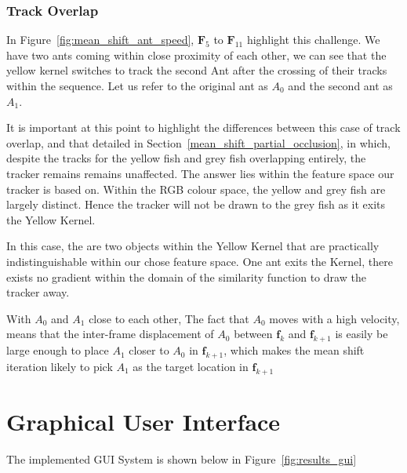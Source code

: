 \subsubsection{Track Overlap}\label{mean_shift_track_overlap}
In Figure~\ref{fig:mean_shift_ant_speed}, $\mathbf{F}_5$ to $\mathbf{F}_{11}$
highlight this challenge. We have two ants coming within close proximity of
each other, we can see that the yellow kernel switches to track the second Ant
after the crossing of their tracks within the sequence. Let us refer to the
original ant as $A_0$ and the second ant as $A_1$. 

It is important at this point to highlight the differences between this case of
track overlap, and that detailed in Section~\ref{mean_shift_partial_occlusion},
in which, despite the tracks for the yellow fish and grey fish overlapping
entirely, the tracker remains remains unaffected.
The answer lies within the feature space our tracker is based on. Within the RGB colour space,
the yellow and grey fish are largely distinct. Hence the tracker will not be
drawn to the grey fish as it exits the Yellow Kernel.

In this case, the are two objects within the Yellow Kernel that are practically
indistinguishable within our chose feature space. One ant exits the Kernel, there exists
no gradient within the domain of the similarity function to draw the tracker away.

With $A_0$ and $A_1$ close to each other, The fact that $A_0$ moves with a high
velocity, means that the inter-frame displacement of $A_0$ between
$\mathbf{f}_k$ and $\mathbf{f}_{k+1}$ is easily be large enough to place $A_1$
closer to $A_0$ in $\mathbf{f}_{k+1}$, which makes the mean shift iteration
likely to pick $A_1$ as the target location in $\mathbf{f}_{k+1}$

\section{Graphical User Interface}
The implemented GUI System is shown below in Figure~\ref{fig:results_gui}



